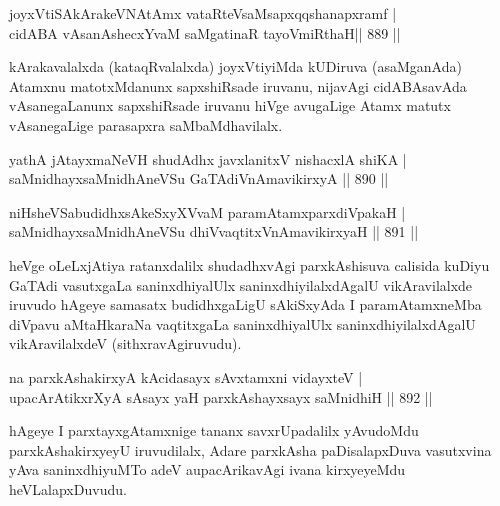 
\begin{shl}
joyxVtiSA\s kArakeVNA\s \s tAmx vataRteV\s saMsapxqqshanapxramf | \\
cidABA vAsanAshecxYvaM saMgatinaR tayoVmiRthaH\hfill ||  889 ||  
\end{shl}

\begin{artha}
kArakavalalxda (kataqRvalalxda) joyxVtiyiMda kUDiruva (asaMganAda) Atamxnu matotxMdanunx sapxshiRsade iruvanu, nijavAgi cidABAsavAda vAsanegaLanunx sapxshiRsade iruvanu hiVge avugaLige Atamx matutx vAsanegaLige parasapxra saMbaMdhavilalx.
\end{artha}


\begin{shl}
yathA jAtayxmaNeVH shudAdhx javxlanitxV nishacxlA shiKA | \\
saMnidhayxsaMnidhAneVSu GaTAdiVnAmavikirxyA \hfill||  890 ||  
\end{shl}
				
\begin{shl}
niHsheVSabudidhxsAkeSxyXVvaM paramAtamxparxdiVpakaH | \\
saMnidhayxsaMnidhAneVSu dhiVvaqtitxVnAmavikirxyaH \hfill||  891 || 
\end{shl}

\begin{artha}
heVge oLeLxjAtiya ratanxdalilx shudadhxvAgi parxkAshisuva calisida kuDiyu GaTAdi vasutxgaLa saninxdhiyalUlx saninxdhiyilalxdAgalU vikAravilalxde iruvudo hAgeye samasatx budidhxgaLigU sAkiSxyAda I paramAtamxneMba diVpavu aMtaHkaraNa vaqtitxgaLa saninxdhiyalUlx saninxdhiyilalxdAgalU vikAravilalxdeV (sithxravAgiruvudu).
\end{artha}

\begin{shl}
na parxkAshakirxyA kAcidasayx sAvxtamxni vidayxteV | \\
upacArAtikxrXyA sA\s sayx yaH parxkAshayxsayx saMnidhiH \hfill||  892 ||  
\end{shl}

\begin{artha}
hAgeye I parxtayxgAtamxnige tananx savxrUpadalilx yAvudoMdu parxkAshakirxyeyU iruvudilalx, Adare parxkAsha paDisalapxDuva vasutxvina yAva saninxdhiyuMTo adeV aupacArikavAgi ivana kirxyeyeMdu heVLalapxDuvudu.
\end{artha}

